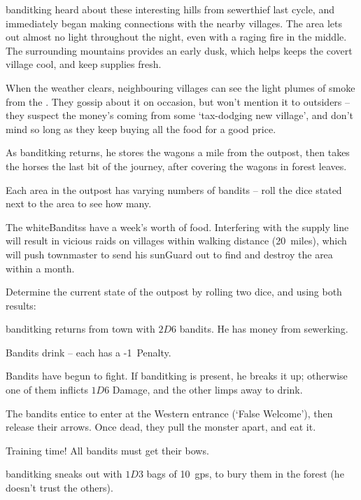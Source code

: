\begin{multicols}{2}

\begin{exampletext}
  \noindent
  \Gls{banditking} heard about these interesting hills from \gls{sewerthief} last \gls{cycle}, and immediately began making connections with the nearby \glspl{village}.
  The area lets out almost no light throughout the night, even with a raging fire in the middle.
  The surrounding mountains provides an early dusk, which helps keeps the covert \gls{village} cool, and keep supplies fresh.
\end{exampletext}

When the weather clears, neighbouring \glspl{village} can see the light plumes of smoke from the .
They gossip about it on occasion, but won't mention it to outsiders -- they suspect the money's coming from some `tax-dodging new \gls{village}', and don't mind so long as they keep buying all the food for a good price.

As \gls{banditking} returns, he stores the wagons a mile from the outpost, then takes the horses the last bit of the journey, after covering the wagons in forest leaves.

Each area in the outpost has varying numbers of bandits -- roll the dice stated next to the area to see how many.

The \glspl{whiteBandits} have a week's worth of food.
Interfering with the supply line will result in vicious raids on \glspl{village} within walking distance (20~miles), which will push \gls{townmaster} to send his \gls{sunGuard} out to find and destroy the area within a month.

Determine the current state of the outpost by rolling two dice, and using both results:

\begin{dlist}
  \item
  \Gls{banditking} returns from \gls{town} with $2D6$ bandits.
  He has money from \gls{sewerking}.
  \item
  Bandits drink -- each has a -1~Penalty.
  \item
  Bandits have begun to fight.
  If \gls{banditking} is present, he breaks it up; otherwise one of them inflicts $1D6$ Damage, and the other limps away to drink.
  \item
  The bandits entice  to enter at the Western entrance (`False Welcome'), then release their arrows.
  Once dead, they pull the \gls{monster} apart, and eat it.
  \item
  Training time!
  All bandits must get their \glspl{bow}.
  \item
  \Gls{banditking} sneaks out with $1D3$ bags of 10~\glspl{gp}, to bury them in the forest (he doesn't trust the others).
\end{dlist}

\end{multicols}

